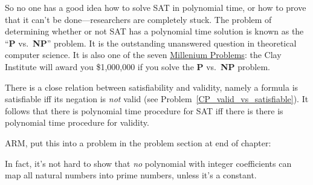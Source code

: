 So no one has a good idea how to solve SAT in polynomial time, or how
to prove that it can't be done---researchers are completely stuck.
The problem of determining whether or not SAT has a polynomial time
solution is known as the ``\textbf{P} vs.\ \textbf{NP}'' problem.  It
is the outstanding unanswered question in theoretical computer
science.  It is also one of the
seven \href{http://www.claymath.org/millennium/}{Millenium Problems}:
the Clay Institute will award you \$1,000,000 if you solve
the \textbf{P} vs.\ \textbf{NP} problem.

There is a close relation between satisfiability and validity, namely a
formula is satisfiable iff its negation is \emph{not} valid (see
Problem~\ref{CP_valid_vs_satisfiable}).  It follows that there is polynomial time
procedure for SAT iff there is there is polynomial time
procedure for validity.

\begin{problems}
\classproblems
{}
\end{problems}

\problemsection

\begin{editingnotes}
ARM, put this into a problem in the problem section at end of chapter:

In fact, it's not hard to show that \emph{no} polynomial
with integer coefficients can map all natural numbers into prime
numbers, unless it's a constant.
\end{editingnotes}

\endinput
